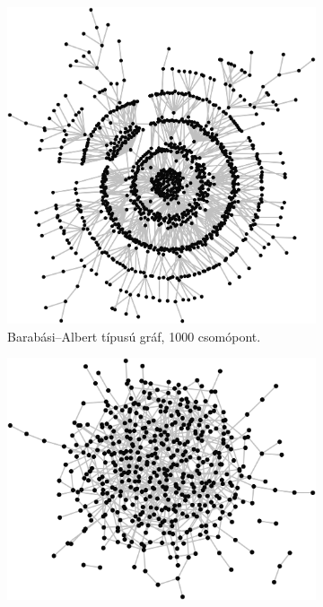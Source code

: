 \begin{figure}[ht]
  \begin{subfigure}[b]{0.5\linewidth}
    \centering
    \includegraphics[width=1\linewidth]{images/barabasi_albert_model.png}
    \caption{ Barabási–Albert típusú gráf, 1000 csomópont. }
    \label{fig:BARABASI_ALBERT_MODEL}
    \vspace{4ex}
  \end{subfigure}%
  \begin{subfigure}[b]{0.5\linewidth}
    \centering
    \includegraphics[width=1\linewidth]{images/erdos_renyi_model.png}

\end{subfigure}
\end{figure}
